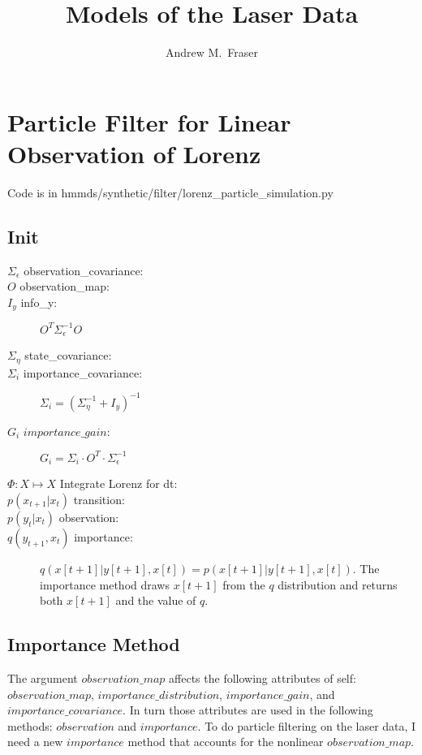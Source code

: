 \documentclass[12pt]{article}
\title{Models of the Laser Data}
\author{Andrew M.\ Fraser}
\begin{document}
\maketitle

\section{Particle Filter for Linear Observation of Lorenz}
\label{sec:linear_observation}

Code is in hmmds/synthetic/filter/lorenz\_particle\_simulation.py

\subsection{Init}
\label{sec:init}

\begin{description}
\item[$\Sigma_\epsilon$ observation\_covariance:] 
\item[$O$ observation\_map:] 
\item[$I_y$ info\_y:] $O^T \Sigma_\epsilon^{-1} O$
\item[$\Sigma_\eta$ state\_covariance:] 
\item[$\Sigma_i$ importance\_covariance:] $\Sigma_i = \left(
    \Sigma_\eta^{-1} + I_y \right)^{-1}$
\item[$G_i$ $importance\_gain$:] $G_i = \Sigma_i \cdot O^T \cdot
  \Sigma_\epsilon^{-1} $
\item[$\Phi: X \mapsto X$ Integrate Lorenz for dt:] 
\item[$p(x_{t+1}|x_t)$ transition:] 
\item[$p(y_t|x_t)$ observation:] 
\item[$q(y_{t+1},x_t)$ importance:] $q(x[t+1]|y[t+1], x[t]) =
  p(x[t+1]|y[t+1], x[t])$.  The importance method draws $x[t+1]$
  from the $q$ distribution and returns both $x[t+1]$ and the value
  of $q$.
\end{description}

\subsection{Importance Method}
\label{sec:importance}

The argument $observation\_map$ affects the following attributes of
self: $observation\_map$, $importance\_distribution$,
$importance\_gain$, and $importance\_covariance$.  In turn those
attributes are used in the following methods: $observation$ and
$importance$.  To do particle filtering on the laser data, I need a
new $importance$ method that accounts for the nonlinear
$observation\_map$.
\end{document}
